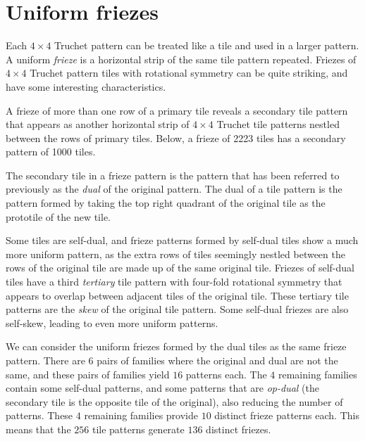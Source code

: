 \documentclass{tufte-book}
\begin{document}
\newpage

\chapter{Uniform friezes}

\noindent
Each $4\times 4$ Truchet pattern can be treated like a tile and used in a larger pattern. A uniform \textit{frieze} is a horizontal strip of the same tile pattern repeated. Friezes of $4\times 4$ Truchet pattern tiles with rotational symmetry can be quite striking, and have some interesting characteristics. 

\vspace{0.5cm}
\noindent
A frieze of more than one row of a primary tile reveals a secondary tile pattern that appears as another horizontal strip of $4\times 4$ Truchet tile patterns nestled between the rows of primary tiles. Below, a frieze of 2223 tiles has a secondary pattern of 1000 tiles.
\,

\vspace{0.5cm}


\vspace{0.5cm}
\noindent
The secondary tile in a frieze pattern is the pattern that has been referred to previously as the \textit{dual} of the original pattern. The dual of a tile pattern is the pattern formed by taking the top right quadrant of the original tile as the prototile of the new tile.

\vspace{0.5cm}
\noindent
Some tiles are self-dual, and frieze patterns formed by self-dual tiles show a much more uniform pattern, as the extra rows of tiles seemingly nestled between the rows of the original tile are made up of the same original tile. Friezes of self-dual tiles have a third \textit{tertiary} tile pattern with four-fold rotational symmetry that appears to overlap between adjacent tiles of the original tile. These tertiary tile patterns are the \textit{skew} of the original tile pattern. Some self-dual friezes are also self-skew, leading to even more uniform patterns.

\vspace{0.5cm}
\noindent
We can consider the uniform friezes formed by the dual tiles as the same frieze pattern. There are $6$ pairs of families where the original and dual are not the same, and these pairs of families yield $16$ patterns each. The $4$ remaining families contain some self-dual patterns, and some patterns that are \textit{op-dual} (the secondary tile is the opposite tile of the original), also reducing the number of patterns. These $4$ remaining families provide $10$ distinct frieze patterns each. This means that the $256$ tile patterns generate $136$ distinct friezes. 
\end{document}
